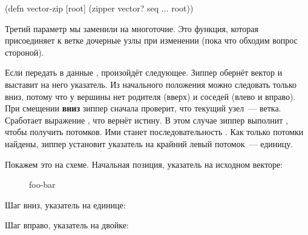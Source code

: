 \begin{english}
  \begin{clojure}
(defn vector-zip
  [root]
  (zipper vector?
          seq
          ...
          root))
  \end{clojure}
\end{english}

Третий параметр мы заменили на многоточие. Это функция, которая присоединяет к
ветке дочерные узлы при изменении (пока что обходим вопрос стороной).

Если передать в  данные \code{[1 2 3]}, произойдёт
следующее. Зиппер обернёт вектор и выставит на него указатель. Из начального
положения можно следовать только вниз, потому что у вершины нет родителя (вверх)
и соседей (влево и вправо). При смещении \textbf{вниз} зиппер сначала проверит,
что текущий узел~--- ветка. Сработает выражение , что
вернёт истину. В этом случае зиппер выполнит , чтобы
получить потомков. Ими станет последовательность . Как только
потомки найдены, зиппер установит указатель на крайний левый потомок~---
единицу.

Покажем это на схеме. Начальная позиция, указатель на исходном векторе:

\begin{figure}[ht!]
  \centering
  \caption{foo-bar}
  \label{fig:foo-bar}
\end{figure}




Шаг вниз, указатель на единице:


Шаг вправо, указатель на двойке:

